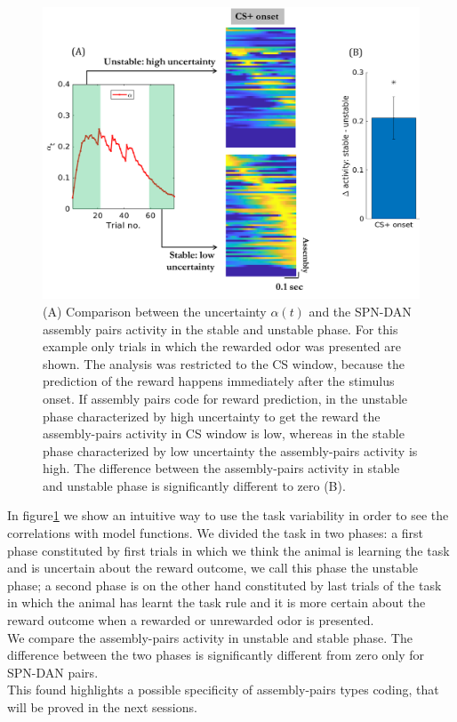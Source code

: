 \begin{figure}
    \centering
    \includegraphics[scale=0.6]{figures/PreRegress.png}
    \caption{(A) Comparison between the uncertainty $\alpha(t)$ and the SPN-DAN assembly pairs activity in the stable and unstable phase. For this example only trials in which the rewarded odor was presented are shown. The analysis was restricted to the CS window, because the prediction of the reward happens immediately after the stimulus onset. If assembly pairs code for reward prediction, in the unstable phase characterized by high uncertainty to get the reward the assembly-pairs activity in CS window is low, whereas in the stable phase characterized by low uncertainty the assembly-pairs activity is high. The difference between the assembly-pairs activity in stable and unstable phase is significantly different to zero (B).}
    \label{fig:StableUnstableAlphaCS}
\end{figure}In figure\ref{fig:StableUnstableAlphaCS} we show an intuitive way to use the task variability in order to see the correlations with model functions. We divided the task in two phases: a first phase constituted by first trials in which we think the animal is learning the task and is uncertain about the reward outcome, we call this phase the unstable phase; a second phase is on the other hand constituted by last trials of the task in which the animal has learnt the task rule and it is more certain about the reward outcome when a rewarded or unrewarded odor is presented.\\We compare the assembly-pairs activity in unstable and stable phase. The difference between the two phases is significantly different from zero only for SPN-DAN pairs.\\This found highlights a possible specificity of assembly-pairs types coding, that will be proved in the next sessions.\\
